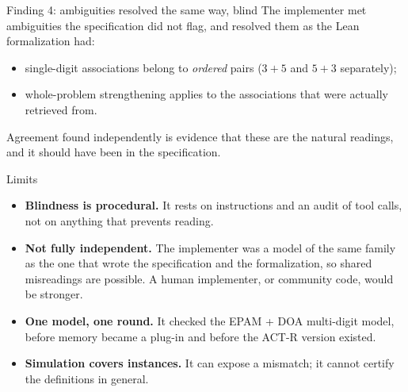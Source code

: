 \documentclass[aspectratio=169,11pt]{beamer}
\begin{document}
\begin{frame}{Finding 4: ambiguities resolved the same way, blind}
  The implementer met ambiguities the specification did not flag, and resolved them as the Lean formalization had:
  \begin{itemize}
    \item single-digit associations belong to \emph{ordered} pairs ($3+5$ and $5+3$ separately);
    \item whole-problem strengthening applies to the associations that were actually retrieved from.
  \end{itemize}
  \bigskip
  Agreement found independently is evidence that these are the natural readings, and it should have been in the specification.
\end{frame}

\begin{frame}{Limits}
  \begin{itemize}
    \item \textbf{Blindness is procedural.} It rests on instructions and an audit of tool calls, not on anything that prevents reading.
    \item \textbf{Not fully independent.} The implementer was a model of the same family as the one that wrote the specification and the formalization, so shared misreadings are possible. A human implementer, or community code, would be stronger.
    \item \textbf{One model, one round.} It checked the EPAM + DOA multi-digit model, before memory became a plug-in and before the ACT-R version existed.
    \item \textbf{Simulation covers instances.} It can expose a mismatch; it cannot certify the definitions in general.
  \end{itemize}
\end{frame}
\end{document}
